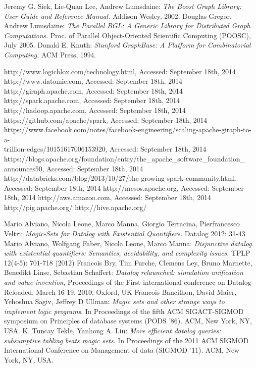 \begin{thebibliography}{99}
 Jeremy G. Siek, Lie-Quan Lee, Andrew Lumsdaine: \textit{The Boost Graph Library: User Guide and Reference Manual.} Addison Wesley, 2002.
 Douglas Gregor, Andrew Lumsdaine: \textit{The Parallel BGL: A Generic Library for Distributed Graph Computations.} Proc. of Parallel Object-Oriented Scientific Computing (POOSC), July 2005.
 Donald E. Knuth: \textit{Stanford GraphBase: A Platform for Combinatorial Computing.} ACM Press, 1994.

 http://www.logicblox.com/technology.html, Accessed: September 18th, 2014
 http://www.datomic.com, Accessed: September 18th, 2014
 http://giraph.apache.com, Accessed: September 18th, 2014
 http://spark.apache.com, Accessed: September 18th, 2014
 http://hadoop.apache.com, Accessed: September 18th, 2014
 https://github.com/apache/spark, Accessed: September 18th, 2014
 https://www.facebook.com/notes/facebook-engineering/scaling-apache-giraph-to-a-\\trillion-edges/10151617006153920, Accessed: September 18th, 2014
 https://blogs.apache.org/foundation/entry/the\_apache\_software\_foundation\_\\announces50, Accessed: September 18th, 2014
 http://databricks.com/blog/2013/10/27/the-growing-spark-community.html, Accessed: September 18th, 2014
 http://mesos.apache.org, Accessed: September 18th, 2014
 http://aws.amazon.com, Accessed: September 18th, 2014
 http://pig.apache.org/
 http://hive.apache.org/

 Mario Alviano, Nicola Leone, Marco Manna, Giorgio Terracina, Pierfrancesco Veltri: \textit{Magic-Sets for Datalog with Existential Quantifiers.} Datalog 2012: 31-43
 Mario Alviano, Wolfgang Faber, Nicola Leone, Marco Manna: \textit{Disjunctive datalog with existential quantifiers: Semantics, decidability, and complexity issues.} TPLP 12(4-5): 701-718 (2012)
 Francois Bry, Tim Furche, Clemens Ley, Bruno Marnette, Benedikt Linse, Sebastian Schaffert: \textit{Datalog relaunched: simulation unification and value invention}, Proceedings of the First international conference on Datalog Reloaded, March 16-19, 2010, Oxford, UK
 Francois Bancilhon, David Maier, Yehoshua Sagiv, Jeffrey D Ullman: \textit{Magic sets and other strange ways to implement logic programs}. In Proceedings of the fifth ACM SIGACT-SIGMOD symposium on Principles of database systems (PODS '86). ACM, New York, NY, USA.
 K. Tuncay Tekle, Yanhong A. Liu: \textit{More efficient datalog queries: subsumptive tabling beats magic sets.} In Proceedings of the 2011 ACM SIGMOD International Conference on Management of data (SIGMOD '11). ACM, New York, NY, USA.


\end{thebibliography}
